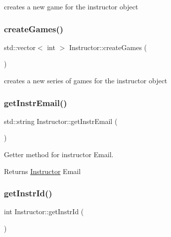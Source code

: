 creates a new game for the instructor object 

\mbox{\label{class_instructor_a8d3fa7d2c4cb8268d43db1bb8ecc56f9}} 
\subsubsection{\texorpdfstring{create\+Games()}{createGames()}}
{\footnotesize\ttfamily std\+::vector$<$ int $>$ Instructor\+::create\+Games (\begin{DoxyParamCaption}{ }\end{DoxyParamCaption})\hspace{0.3cm}{\ttfamily [private]}}



creates a new series of games for the instructor object 

\mbox{\label{class_instructor_a91cb628e3c244a451f121236cbb3bc20}} 
\subsubsection{\texorpdfstring{get\+Instr\+Email()}{getInstrEmail()}}
{\footnotesize\ttfamily std\+::string Instructor\+::get\+Instr\+Email (\begin{DoxyParamCaption}{ }\end{DoxyParamCaption})}



Getter method for instructor Email. 

\begin{DoxyReturn}{Returns}
\hyperlink{class_instructor}{Instructor} Email 
\end{DoxyReturn}
\mbox{\label{class_instructor_a7f9c4b2b1e3da3ca45d78a9f11a68fc0}} 
\subsubsection{\texorpdfstring{get\+Instr\+Id()}{getInstrId()}}
{\footnotesize\ttfamily int Instructor\+::get\+Instr\+Id (\begin{DoxyParamCaption}{ }\end{DoxyParamCaption})}



